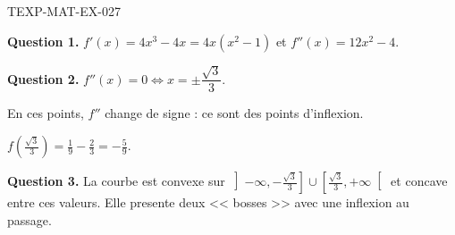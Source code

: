 \begin{corrige}{TEXP-MAT-EX-027}

\textbf{Question 1.} $f'(x) = 4x^3 - 4x = 4x(x^2-1)$ et $f''(x) = 12x^2 - 4$.


\textbf{Question 2.} $f''(x) = 0 \iff x = \pm\dfrac{\sqrt{3}}{3}$.

En ces points, $f''$ change de signe : ce sont des points d'inflexion.

$\displaystyle f\!\left(\frac{\sqrt{3}}{3}\right) = \frac{1}{9} - \frac{2}{3} = -\frac{5}{9}$.

\textbf{Question 3.} La courbe est convexe sur $\left]-\infty, -\frac{\sqrt3}{3}\right] \cup \left[\frac{\sqrt3}{3}, +\infty\right[$ et concave entre ces valeurs. Elle presente deux << bosses >> avec une inflexion au passage.

\end{corrige}
